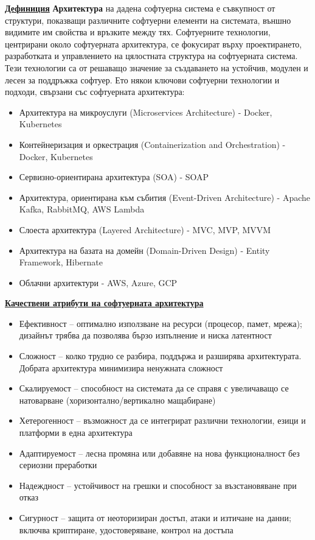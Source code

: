 \documentclass{article}
\begin{document}
\textbf{\underline{Дефиниция}}
\textbf{Архитектура} на дадена софтуерна система е съвкупност от структури, показващи различните софтуерни елементи на
системата, външно видимите им свойства и връзките между тях. \newline\newline
Софтуерните технологии, центрирани около софтуерната архитектура, се фокусират върху проектирането, разработката и управлението на цялостната
структура на софтуерната система. Тези технологии са от решаващо значение за създаването на устойчив, модулен и лесен за поддръжка софтуер. Ето
някои ключови софтуерни технологии и подходи, свързани със софтуерната архитектура:
\begin{itemize}
    \item Архитектура на микроуслуги (Microservices Architecture) - Docker, Kubernetes
    \item Контейнеризация и оркестрация (Containerization and Orchestration) - Docker, Kubernetes
    \item Сервизно-ориентирана архитектура (SOA) - SOAP
    \item Архитектура, ориентирана към събития (Event-Driven Architecture) - Apache Kafka, RabbitMQ, AWS Lambda
    \item Слоеста архитектура (Layered Architecture) - MVC, MVP, MVVM
    \item Архитектура на базата на домейн (Domain-Driven Design) - Entity Framework, Hibernate
    \item Облачни архитектури - AWS, Azure, GCP
\end{itemize}
\textbf{\underline{Качествени атрибути на софтуерната архитектура}}
\begin{itemize}
    \item Ефективност – оптимално използване на ресурси (процесор, памет, мрежа); дизайнът трябва да позволява бързо изпълнение и ниска латентност
    \item Сложност – колко трудно се разбира, поддържа и разширява архитектурата. Добрата архитектура минимизира ненужната сложност
    \item Скалируемост – способност на системата да се справя с увеличаващо се натоварване (хоризонтално/вертикално мащабиране)
    \item Хетерогенност – възможност да се интегрират различни технологии, езици и платформи в една архитектура
    \item Адаптируемост – лесна промяна или добавяне на нова функционалност без сериозни преработки
    \item Надеждност – устойчивост на грешки и способност за възстановяване при отказ
    \item Сигурност – защита от неоторизиран достъп, атаки и изтичане на данни; включва криптиране, удостоверяване, контрол на достъпа
\end{itemize}
\end{document}
